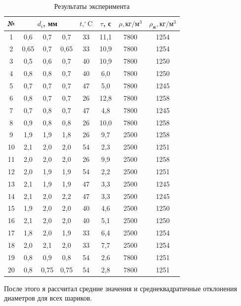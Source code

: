 \documentclass[12pt]{article}
\begin{document}
	\begin{table}[h!]
	\caption{Результаты эксперимента}
	\label{table:results_exp}
	\begin{center}
	\begin{tabular}{|c|c|c|c|c|c|c|c|}
	\hline
	№ & \multicolumn{3}{c|}{$d_i$, мм} & $t, ^\circ \text{C}$ & $\tau$, с & $\rho, \text{кг}/ \text{м}^3$ & $\rho_\text{ж}, \text{кг}/ \text{м}^3$ \\
	\hline
	1 & 0,6 & 0,7 & 0,7 & 33 & 11,1 & 7800 & 1254 \\
	2 & 0,65 & 0,7 & 0,65 & 33 & 10,9 & 7800 & 1254 \\
	3 & 0,5 & 0,6 & 0,7 & 40 & 10,9 & 7800 & 1250 \\
	4 & 0,8 & 0,8 & 0,7 & 40 & 6,0 & 7800 & 1250 \\
	5 & 0,7 & 0,7 & 0,7 & 47 & 5,0 & 7800 & 1245 \\
	6 & 0,8 & 0,7 & 0,7 & 26 & 12,8 & 7800 & 1258 \\
	7 & 0,7 & 0,8 & 0,7 & 47 & 4,8 & 7800 & 1245 \\
	8 & 0,9 & 0,8 & 0,8 & 26 & 10,0 & 7800 & 1258 \\
	9 & 1,9 & 1,9 & 1,8 & 26 & 9,7 & 2500 & 1258 \\
	10 & 2,1 & 2,0 & 2,0 & 54 & 2,3 & 2500 & 1251 \\
	11 & 2,0 & 2,0 & 2,0 & 26 & 9,9 & 2500 & 1258 \\
	12 & 2,0 & 1,9 & 1,9 & 54 & 2,2 & 2500 & 1251 \\
	13 & 2,1 & 1,9 & 1,9 & 47 & 3,3 & 2500 & 1245 \\
	14 & 2,1 & 2,0 & 2,2 & 47 & 3,3 & 2500 & 1245 \\
	15 & 1,9 & 2,0 & 2,0 & 40 & 4,6 & 2500 & 1250 \\
	16 & 2,1 & 2,0 & 2,0 & 40 & 5,1 & 2500 & 1250 \\
	17 & 1,8 & 2,0 & 1,9 & 33 & 6,4 & 2500 & 1254 \\
	18 & 2,0 & 2,1 & 2,0 & 33 & 7,7 & 2500 & 1254 \\
	19 & 0,8 & 0,9 & 0,8 & 54 & 2,6 & 7800 & 1251 \\
	20 & 0,8 & 0,75 & 0,75 & 54 & 2,8 & 7800 & 1251 \\
	\hline
	\end{tabular}
	\end{center}
	\end{table}
	
	После этого я рассчитал средние значения и среднеквадратичные отклонения диаметров для всех шариков.
	
\end{document}

